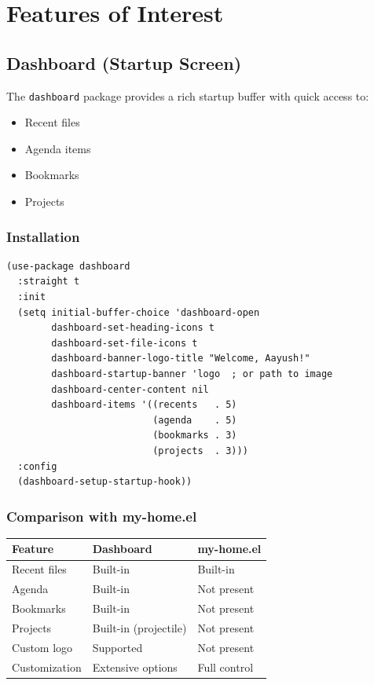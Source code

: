 \documentclass[11pt]{article}
\begin{document}
\section{Features of Interest}
\label{sec:org5071b90}

\subsection{Dashboard (Startup Screen)}
\label{sec:org6e0d1ed}

The \texttt{dashboard} package provides a rich startup buffer with quick access to:
\begin{itemize}
\item Recent files
\item Agenda items
\item Bookmarks
\item Projects
\end{itemize}
\subsubsection{Installation}
\label{sec:org4678e92}

\begin{verbatim}
(use-package dashboard
  :straight t
  :init
  (setq initial-buffer-choice 'dashboard-open
        dashboard-set-heading-icons t
        dashboard-set-file-icons t
        dashboard-banner-logo-title "Welcome, Aayush!"
        dashboard-startup-banner 'logo  ; or path to image
        dashboard-center-content nil
        dashboard-items '((recents   . 5)
                          (agenda    . 5)
                          (bookmarks . 3)
                          (projects  . 3)))
  :config
  (dashboard-setup-startup-hook))
\end{verbatim}
\subsubsection{Comparison with my-home.el}
\label{sec:org17f63ff}

\begin{center}
\begin{tabular}{lll}
Feature & Dashboard & my-home.el\\
\hline
Recent files & Built-in & Built-in\\
Agenda & Built-in & Not present\\
Bookmarks & Built-in & Not present\\
Projects & Built-in (projectile) & Not present\\
Custom logo & Supported & Not present\\
Customization & Extensive options & Full control\\
\end{tabular}
\end{center}
\end{document}
